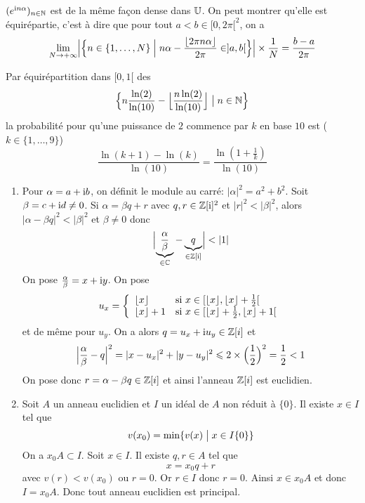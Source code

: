 \begin{remark}
	$(e^{\mathrm{i}n\alpha})_{n\in\mathbb{N}}$ est de la même façon dense dans $\mathbb{U}$. On peut montrer qu'elle est équirépartie, c'est à dire que pour tout $a<b\in[0,2\pi[^{2}$, on a 
	$$\lim\limits_{N\to+\infty}\Bigl\vert\Bigl\{n\in\{1,\dots,N\}\Bigm| n\alpha-\frac{\lfloor 2\pi n\alpha\rfloor}{2\pi}\in]a,b[\Bigr\}\Bigr\vert\times\frac{1}{N}=\frac{b-a}{2\pi}$$
\end{remark}

\begin{remark}
	Par équirépartition dans $[0,1[$ des 
	$$\Bigl\{n\frac{\ln(2)}{\ln(10)}-\Bigl\lfloor\frac{n\ln(2)}{\ln(10)}\Bigr\rfloor\bigm| n\in\mathbb{N}\Bigr\}$$
	la probabilité pour qu'une puissance de $2$ commence par $k$ en base $10$ est ($k\in\{1,\dots,9\}$)
	$$\frac{\ln(k+1)-\ln(k)}{\ln(10)}=\frac{\ln(1+\frac{1}{k})}{\ln(10)}$$
\end{remark}

\begin{solution}
	\phantom{}
	\begin{enumerate}
		\item Pour $\alpha=a+\mathrm{i} b$, on définit le module au carré: $\vert\alpha\vert^{2}=a^{2}+b^{2}$. Soit $\beta=c+\mathrm{i} d\neq0$. Si $\alpha=\beta q+r$ avec $q,r\in\mathbb{Z}[\mathrm{i}]^{2}$ et $\vert r\vert^{2}<\vert \beta\vert^{2}$, alors $\vert\alpha-\beta q\vert^{2}<\vert\beta\vert^{2}$ et $\beta\neq0$ donc
		$$\Bigl\vert\underbrace{\frac{\alpha}{\beta}}_{\in\mathbb{C}}-\underbrace{q}_{\in\mathbb{Z}[\mathrm{i}]}\Bigr\vert<\vert 1\vert$$
		On pose $\frac{\alpha}{\beta}=x+\mathrm{i} y$. On pose 
		$$
		u_{x}=
		\left\{
			\begin{array}[]{ll}
				\lfloor x\rfloor & \text{si }x\in[\lfloor x\rfloor,\lfloor x\rfloor+\frac{1}{2}[\\
				\lfloor x\rfloor+1 & \text{si }x\in[\lfloor x\rfloor+\frac{1}{2},\lfloor x\rfloor+1[
			\end{array}
		\right.
		$$
		et de même pour $u_{y}$. On a alors $q=u_{x}+\mathrm{i} u_{y}\in\mathbb{Z}[i]$ et 
		$$\Bigl\vert\frac{\alpha}{\beta}-q\Bigr\vert^{2}=\vert x-u_{x}\vert^{2}+\vert y-u_{y}\vert^{2}\leqslant2\times \Bigl(\frac{1}{2}\Bigr)^{2}=\frac{1}{2}<1$$
		On pose donc $r=\alpha-\beta q\in\mathbb{Z}[i]$ et ainsi l'anneau $\mathbb{Z}[i]$ est euclidien.

		\item Soit $A$ un anneau euclidien et $I$ un idéal de $A$ non réduit à $\{0\}$. Il existe $x\in I$ tel que 
		$$v(x_{0})=\min\{v(x)\bigm| x\in I\{0\}\}$$
		On a $x_{0}A\subset I$. Soit $x\in I$. Il existe $q,r\in A$ tel que 
		$$x=x_{0}q+r$$
		avec $v(r)<v(x_{0})$ ou $r=0$. Or $r\in I$ donc $r=0$. Ainsi $x\in x_{0}A$ et donc $I=x_{0}A$. Donc tout anneau euclidien est principal.
	\end{enumerate}
\end{solution}

